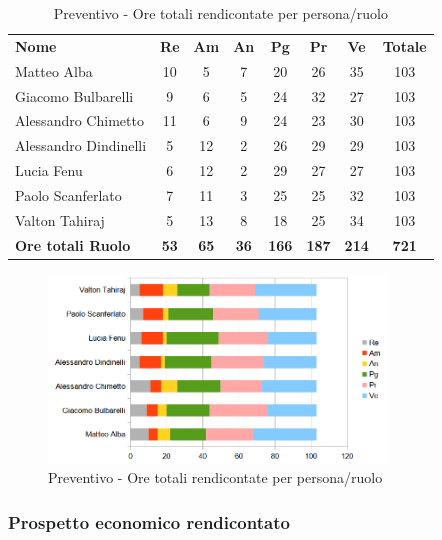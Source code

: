 		\begin{table} [h!]
			\begin{center}
				\begin{tabular} { m{3.5cm} c c c c c c c }
					\rowcolor{lightgray}
					\textbf{Nome} & \textbf{Re} & \textbf{Am} & \textbf{An} & \textbf{Pg} & \textbf{Pr} & \textbf{Ve} & \textbf{Totale} \\
					Matteo Alba & 10 & 5 & 7 & 20 & 26 & 35 & 103 \\
					Giacomo Bulbarelli & 9 & 6 & 5 & 24 & 32 & 27 & 103 \\
					Alessandro Chimetto & 11 & 6 & 9 & 24 & 23 & 30 & 103 \\
					Alessandro Dindinelli & 5 & 12 & 2 & 26 & 29 & 29 & 103 \\
					Lucia Fenu & 6 & 12 & 2 & 29 & 27 & 27 & 103 \\
					Paolo Scanferlato & 7 & 11 & 3 & 25 & 25 & 32 & 103 \\
					Valton Tahiraj & 5 & 13 & 8 & 18 & 25 & 34 & 103 \\
					\textbf{Ore totali Ruolo} & \textbf{53} & \textbf{65} & \textbf{36} & \textbf{166} & \textbf{187}& \textbf{214} & \textbf{721}
				\end{tabular}
				\caption{Preventivo - Ore totali rendicontate per persona/ruolo}
			\end{center}
		\end{table}
	
		\begin{figure} [h!]
			\centering
			\includegraphics[width=0.8\textwidth]{res/img/preventivi/totrend-barre.png}
			\caption{Preventivo - Ore totali rendicontate per persona/ruolo} 
		\end{figure}
	
	\newpage
	
	\subsubsection{Prospetto economico rendicontato}
	
